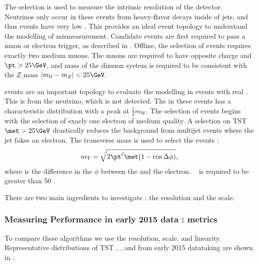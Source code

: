 The \Zll selection is used to measure the intrinsic \met resolution of the detector.
Neutrinos only occur in these events from heavy-flavor decays inside of jets, and thus \Zll events have very low \met.
This provides an ideal event topology to understand the modelling of \met mismeasurement.
Candidate \Zmm events are first required to pass a muon or electron trigger, as described in .
Offline, the selection of \Zmm events requires exactly two medium muons.
The muons are required to have opposite charge and $\pt > 25 \GeV$, and mass of the dimuon system is required to be consistent with the $Z$ mass $|m_{ll} - m_Z | < 25 \GeV$.

\Wln events are an important topology to evaluate the \met modelling in events with real \met.
This \met is from the neutrino, which is not detected.
The \met in these events has a characteristic distribution with a peak at $\frac{1}{2} m_W$.
The selection of \Wen events begins with the selection of exacly one electron of medium quality.
A selection on TST $\met > 25 \GeV$  drastically reduces the background from multijet events where the jet fakes an electron.
The transverse mass is used to select the \Wen events :
\begin{equation}
  \mT = \sqrt{ 2\pt^{\ell} \met (1-\cos{\deltaPhi}) },
\label{eq:mT}
\end{equation}
where \deltaPhi is the difference in the $\phi$ between the \met and the electron.
\mT~ is required to be greater than 50 \GeV.

There are two main ingredients to investigate : the \met resolution and the \met scale.

\subsubsection{Measuring \met Performance in early 2015 data : metrics}

To compare these algorithms we use the \met resolution, \met scale, and linearity.
Representative distributions of TST , , and  \met from early 2015 datataking are shown in .

